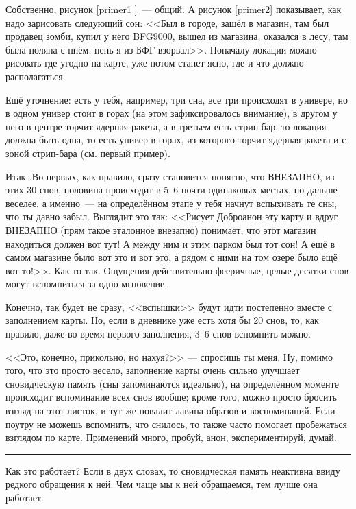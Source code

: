 \documentclass[a4paper,14pt,oneside]{memoir}
\begin{document}
Собственно, рисунок \ref{primer1 }~--- общий. А рисунок \ref{primer2} показывает, как надо зарисовать следующий сон: <<Был в городе, зашёл в магазин, там был продавец зомби, купил у него BFG9000, вышел из магазина, оказался в лесу, там была поляна с пнём, пень я из БФГ взорвал>>. Поначалу локации можно рисовать где угодно на карте, уже потом станет ясно, где и что должно располагаться.


Ещё уточнение: есть у тебя, например, три сна, все три происходят в универе, но в одном универ стоит в горах (на этом зафиксировалось внимание), в другом у него в центре торчит ядерная ракета, а в третьем есть стрип-бар, то локация должна быть одна, то есть универ в горах, из которого торчит ядерная ракета и с зоной стрип-бара (см. первый пример).

Итак\ldots Во-первых, как правило, сразу становится понятно, что ВНЕЗАПНО, из этих 30 снов, половина происходит в 5--6 почти одинаковых местах, но дальше веселее, а именно~--- на определённом этапе у тебя начнут вспыхивать те сны, что ты давно забыл. Выглядит это так: <<Рисует Доброанон эту карту и вдруг ВНЕЗАПНО (прям такое эталонное внезапно) понимает, что этот магазин находиться должен вот тут! А между ним и этим парком был тот сон! А ещё в самом магазине было вот это и вот это, а рядом с ними на том озере было ещё вот то!>>. Как-то так. Ощущения действительно фееричные, целые десятки снов могут вспомниться за одно мгновение.

Конечно, так будет не сразу, <<вспышки>> будут идти постепенно вместе с заполнением карты. Но, если в дневнике уже есть хотя бы 20 снов, то, как правило, даже во время первого заполнения, 3--6 снов вспомнить можно. 

<<Это, конечно, прикольно, но нахуя?>> — спросишь ты меня. Ну, помимо того, что это просто весело, заполнение карты очень сильно улучшает сновидческую память (сны запоминаются идеально), на определённом моменте происходит вспоминание всех снов вообще; кроме того, можно просто бросить взгляд на этот листок, и тут же повалит лавина образов и воспоминаний. Если поутру не можешь вспомнить, что снилось, то также часто помогает пробежаться взглядом по карте. Применений много, пробуй, анон, экспериментируй, думай.

\smallskip

\fancybreak{* * *}

Как это работает? Если в двух словах, то сновидческая память неактивна ввиду редкого обращения к ней. Чем чаще мы к ней обращаемся, тем лучше она работает.
\end{document}
